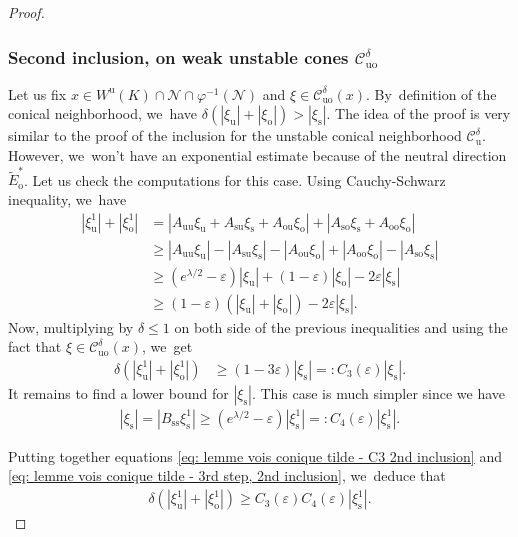 \documentclass[11pt]{article}
\newcommand{\ro}{\mathrm{o}}
\newcommand{\rs}{\mathrm{s}}
\newcommand{\rso}{\mathrm{so}}
\newcommand{\ru}{\mathrm{u}}
\newcommand{\ruo}{\mathrm{uo}}
\theoremstyle{definition}
\theoremstyle{plain}
\newcommand{\Ccal}{\mathcal{C}}
\newcommand{\Ncal}{\mathcal{N}}
\begin{document}
\begin{proof}
\subsubsection*{Second inclusion, on weak unstable cones $\Ccal_{\ruo}^{\delta}$} Let us fix $x \in W^\ru (K) \cap \Ncal \cap \varphi^{-1}(\Ncal) $ and $\xi \in \Ccal_{\ruo}^{\delta} (x)$. By~definition of the conical neighborhood, we~have $\delta (|\xi_\ru| + |\xi_\ro|) > |\xi_\rs| $. The idea of the proof is very similar to the proof of the inclusion for the unstable conical neighborhood $\Ccal_{\ru}^{\delta}$. However, we~won't have an exponential estimate because of the neutral direction $\widetilde{E}_\ro^*$. Let us check the computations for this case. Using Cauchy-Schwarz inequality, we~have
\begin{align*}
|\xi_\ru^1| + |\xi_\ro^1| &= |A_{\ru\ru} \xi_\ru + A_{\rs\ru} \xi_\rs + A_{\ro\ru} \xi_\ro | + |A_{\rso} \xi_\rs + A_{\ro\ro} \xi_\ro | \\
&\geq |A_{\ru\ru} \xi_\ru| - |A_{\rs\ru} \xi_\rs| - |A_{\ro\ru} \xi_\ro | + | A_{\ro\ro} \xi_\ro | - | A_{\rso} \xi_\rs |\\
&\geq (e^{\lambda/2} - \varepsilon)|\xi_\ru| + (1 - \varepsilon) |\xi_\ro| - 2\varepsilon|\xi_\rs| \\
&\geq (1 - \varepsilon) (|\xi_\ru| + |\xi_\ro|) - 2\varepsilon |\xi_\rs|.
\end{align*}
Now, multiplying by $\delta \leq 1$ on both side of the previous inequalities and using the fact that $\xi \in \Ccal_{\ruo}^{\delta} (x)$, we~get
\begin{equation}\label{eq: lemme vois conique tilde - C3 2nd inclusion}
\begin{split}
\delta (|\xi_\ru^1| + |\xi_\ro^1|) &\geq (1 - 3\varepsilon) |\xi_\rs| =: C_3 (\varepsilon) |\xi_\rs|.
\end{split}
\end{equation}
It remains to find a lower bound for $|\xi_\rs|$. This case is much simpler since we have
\begin{align}\label{eq: lemme vois conique tilde - 3rd step, 2nd inclusion}
|\xi_\rs| = |B_{\rs\rs} \xi_\rs^1| \geq (e^{\lambda/2} -\varepsilon) |\xi_\rs^1| =: C_4 (\varepsilon) |\xi_\rs^1|.
\end{align}

Putting together equations \eqref{eq: lemme vois conique tilde - C3 2nd inclusion} and \eqref{eq: lemme vois conique tilde - 3rd step, 2nd inclusion}, we~deduce that
\begin{align*}
\delta(|\xi_\ru^1| + |\xi_\ro^1|) \geq C_3 (\varepsilon) C_4 (\varepsilon) |\xi_\rs^1|.
\end{align*}


\end{proof}
\end{document}
